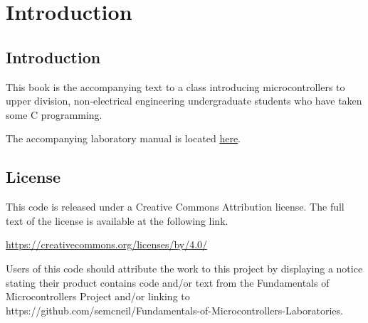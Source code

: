 \chapter{Introduction}

\section{Introduction}
This book is the accompanying text to a class introducing microcontrollers
to upper division, non-electrical engineering undergraduate students who 
have taken some C programming.

The accompanying laboratory manual is located 
\href{https://github.com/semcneil/Fundamentals-of-Microcontrollers-Laboratories}{here}.

\section{License}
This code is released under a Creative Commons Attribution license.
The full text of the license is available at the following link.

\href{https://creativecommons.org/licenses/by/4.0/}{https://creativecommons.org/licenses/by/4.0/}

Users of this code should attribute the work to this
project by displaying a notice stating their product contains code
and/or text from the Fundamentals of Microcontrollers Project and/or linking to\\
https://github.com/semcneil/Fundamentals-of-Microcontrollers-Laboratories.